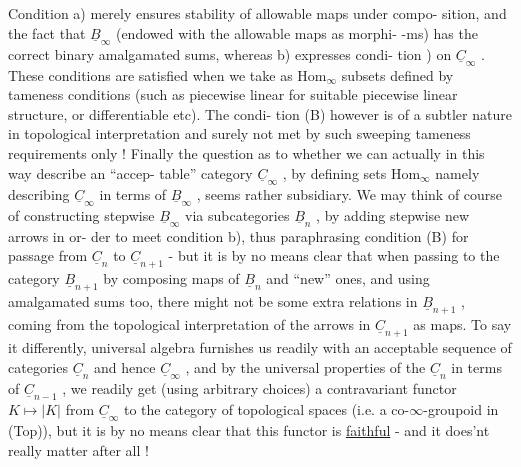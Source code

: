 Condition a) merely ensures stability of allowable maps under compo-%
sition, and the fact that $\underline{B}_\infty$ (endowed with the allowable maps as morphi-%
-ms) has the correct binary amalgamated sums, whereas b) expresses condi-%
tion ) on $\underline{C}_\infty$ . These conditions are satisfied when we take as $\mathrm{Hom}_\infty$
subsets defined by tameness conditions (such as piecewise linear for
suitable piecewise linear structure, or differentiable etc). The condi-%
tion (B) however is of a subtler nature in  topological interpretation\hand{,}
and surely not met by such sweeping tameness requirements only ! Finally
the question as to whether we can actually in this way describe an ``accep-%
table'' category $\underline{C}_\infty$ , by defining sets $\mathrm{Hom}_\infty$ namely describing $\underline{C}_\infty$ in terms
of $\underline{B}_\infty$ , seems rather subsidiary. We may think of course of constructing
stepwise $\underline{B}_\infty$ via subcategories $\underline{B}_n$ , by adding stepwise new arrows in or-%
der to meet condition b), thus paraphrasing condition (B) for passage 
from $\underline{C}_n$ to $\underline{C}_{n+1}$ - but it is by no means clear that when passing to the
category $\underline{B}_{n+1}$ by composing  maps of $\underline{B}_n$ and ``new'' ones, and
using amalgamated sums too, there might not be some  extra relations
 in $\underline{B}_{n+1}$ , coming from the topological interpretation of the arrows
in $\underline{C}_{n+1}$ as maps. To say it differently, universal algebra furnishes us
readily with an acceptable sequence of categories $\underline{C}_n$ and hence $\underline{C}_\infty$ , and
by the universal properties of the $\underline{C}_n$ in terms of $\underline{C}_{n-1}$ , we readily get
(using arbitrary choices) a contravariant functor $K \mapsto |K|$ from $\underline{C}_\infty$ to
the category of topological spaces (i.e. a co-$\infty$-groupoid in (Top)), but
it is by no means clear that this functor is \uline{faithful} - and it does'nt
really matter after all !

